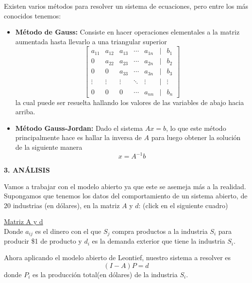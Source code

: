 \documentclass[10pt,a4paper]{article}
\begin{document}
\begin{multicols}{2}
\begin{itemize}
 Existen varios métodos para resolver un sistema de ecuaciones, pero entre los más conocidos tenemos:
 \begin{itemize}
 	\item \textbf{Método de Gauss:} Consiste en hacer operaciones elementales a la matriz aumentada hasta llevarlo a una triangular superior
 	\begin{equation*}
 		\begin{bmatrix}
	 		a_{11}&a_{12}&a_{13}&\cdots&a_{1n}&|&b_{1}\\
	 		0&a_{22}&a_{23}&\cdots&a_{2n}&|&b_{2}\\
	 		0&0&a_{33}&\cdots&a_{3n}&|&b_{3}\\
	 		\vdots&\vdots&\vdots&\ddots&\vdots&|&\vdots\\
	 		0&0&0&\cdots&a_{nn}&|&b_n
 		\end{bmatrix}
 	\end{equation*}
 	la cual puede ser resuelta hallando los valores de las variables de abajo hacia arriba.
 	\item \textbf{Método Gauss-Jordan:} Dado el sistema $Ax=b$, lo que este método principalmente hace es hallar la inversa de $A$ para luego obtener la solución de la siguiente manera $$x=A^{-1}b$$ 
 	\end{itemize}
\end{itemize}
\newpage
\begin{center}
{\large \bf 3. AN\'ALISIS}
\end{center}
Vamos a trabajar con el modelo abierto ya que este se asemeja más a la realidad. Supongamos que tenemos los datos del comportamiento de un sistema abierto, de 20 industrias (en dólares), en la matriz $A $ y $d$: (click en el siguiente cuadro)

\href{https://nbviewer.jupyter.org/github/MillerSilva/numerical-analysis/blob/master/genera_sistema.ipynb}{Matriz A y d}
\\
\noindent Donde $a_{ij}$ es el dinero con el que $S_j$ compra productos a la industria $S_i$ para producir \$1 de producto y $d_i$ es la demanda exterior que tiene la industria $S_i$.

\noindent Ahora aplicando el modelo abierto de Leontief, nuestro sistema a resolver es $$(I-A)P=d$$ donde $P_i$ es la producción total(en dólares) de la industria $S_i$.
%


\end{multicols}
\end{document}
